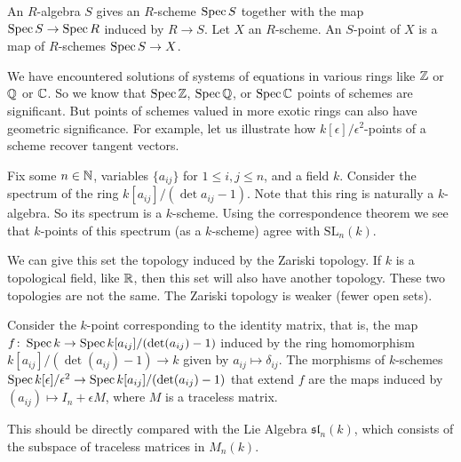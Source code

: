   An \(R\)-algebra \(S\) gives an \(R\)-scheme \(\operatorname{Spec} S\) together with the map \(\operatorname{Spec} S \to \operatorname{Spec} R\) induced by \(R \to S\).
  Let \(X\) an \(R\)-scheme.
  An \(S\)-point of \(X\) is a map of \(R\)-schemes \(\operatorname{Spec} S \to X\).


  We have encountered solutions of systems of equations in various rings like \(\mathbb{Z}\) or \(\mathbb{Q}\) or \(\mathbb{C}\).
  So we know that \(\operatorname{Spec} \mathbb{Z}\), \(\operatorname{Spec} \mathbb{Q}\), or \(\operatorname{Spec} \mathbb{C}\) points of schemes are significant.
  But points of schemes valued in more exotic rings can also have geometric significance.
  For example, let us illustrate how \(k[\epsilon]/\epsilon^2\)-points of a scheme recover tangent vectors.

  Fix some $n \in \mathbb{N}$, variables $\{a_{ij}\}$ for $1 \le i,j \le n$, and a field \(k\).
  Consider the spectrum of the ring $k[a_{ij}]/(\det a_{ij} - 1)$.
  Note that this ring is naturally a \(k\)-algebra.
  So its spectrum is a \(k\)-scheme.
  Using the correspondence theorem we see that \(k\)-points of this spectrum (as a \(k\)-scheme) agree with $\text{SL}_n(k)$.

  \begin{remark}
  We can give this set the topology induced by the Zariski topology.
  If \(k\) is a topological field, like \(\mathbb{R}\), then this set will also have another topology.
  These two topologies are not the same.
  The Zariski topology is weaker (fewer open sets).  
  \end{remark}
  
\begin{proposition} \label{SL LieAlg}
Consider the $k$-point corresponding to the identity matrix, that is, the map $f \colon \operatorname{Spec} k \to \operatorname{Spec} k[a_{ij}]/(\det(a_{ij}) - 1)$ induced by the ring homomorphism $k[a_{ij}]/(\det (a_{ij}) - 1) \to k$ given by $a_{ij} \mapsto \delta_{ij}$. The morphisms of \(k\)-schemes $\operatorname{Spec} k[\epsilon]/\epsilon^2 \to \operatorname{Spec} k[a_{ij}]/(\det (a_{ij}) - 1)$ that extend $f$ are the maps induced by $(a_{ij}) \mapsto I_n + \epsilon M$, where $M$ is a traceless matrix.
\end{proposition}

\begin{remark}
This should be directly compared with the Lie Algebra $\mathfrak{sl}_n(k)$, which consists of the subspace of traceless matrices in $M_n(k)$.
\end{remark}

